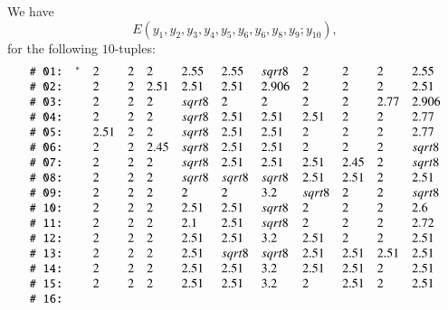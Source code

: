 \begin{tarskidata}
\begin{tarski}
\begin{lemma}
We have 
   $$
   E(y_1,y_2,y_3,y_4,y_5,y_6,y_6,y_8,y_9;y_{10}),
   $$
for the following $10$-tuples:
$$
\def\tuid#1{\relax} %
\def\rr#1{\text{\tt \# #1:}}
\begin{array}{llllllllllll}
%
 \rr{01}&\tuid{GVKETKP} \tlabel{tarski:2t0-doesnt-pass-through}\usage{DCG-[4.19]{ lemma:2t0-doesnt-pass-through}}
   &2 &2 &2 & 2.55&  2.55 & \sqrt{8}&  2 & 2 & 2 & 2.55\\
%
 \rr{02}&\tuid{SDUXZXL}\tlabel{tarski:E1453}
   &2 &2 &2.51 &2.51& 2.51 &2.906& 2 & 2 &2 & 2.51\\ 
%
 \rr{03}&\tuid{DIKGYMO}\tlabel{tarski:dcg-p89}
   &2 &2 &2 &\sqrt8& 2 &2& 2 & 2 & 2.77 &2.906\\
%
 \rr{04}&\tuid{HYEOHXS}\tlabel{tarski:enclosed-v}
   &2 &2 &2 &\sqrt{8}& 2.51 &2.51& 2.51 & 2 & 2 &  2.77\\
%
 \rr{05}&\tuid{MCWJKBZ}\tlabel{tarski:277}
   &2.51 &2 &2 &\sqrt{8}& 2.51 &2.51& 2 & 2 & 2 & 2.77\\
%
 \rr{06}&\tuid{TVORNRR}\tlabel{tarski:245}
   &2 &2 &2.45 &\sqrt{8}& 2.51 &2.51& 2 & 2 & 2 & \sqrt{8}\\
%
 \rr{07}&\tuid{AMVZLGB}\tlabel{tarski:245bis}
   &2 &2 &2 &\sqrt{8}& 2.51 &2.51& 2.51 & 2.45 & 2 & \sqrt{8}\\
%
 \rr{08}&\tuid{TVBTKEK}\tlabel{tarski:node}
   &2 &2 &2 &\sqrt8& \sqrt8 &\sqrt8& 2.51 & 2.51 & 2 & 2.51\\
%
 \rr{09}&\tuid{UREAOFU}\tlabel{tarski:E:part4:1}
   &2 &2 &2 &  2& 2 &3.2&   \sqrt{8} & 2 & 2 &  \sqrt{8}\\
%
 \rr{10}&\tuid{MYWEFEM}\tlabel{tarski:E:part4:2}
   &2 &2 &2 &2.51 & 2.51  &\sqrt{8}&   2 & 2 & 2 &  2.6\\
%
 \rr{11}&\tuid{EVWERXQ}\tlabel{tarski:E:part4:3}
   &2 &2 &2 &2.1& 2.51  &\sqrt{8}&   2 & 2 & 2 &  2.72\\
%
 \rr{12}&\tuid{EKTYKKO}\tlabel{tarski:E:part4:4}
   &    2 &2 &2 &  2.51& 2.51 &3.2&   2.51 & 2 & 2 & 2.51\\
%
 \rr{13}&\tuid{TZKIBQD}\tlabel{tarski:E:part4:5}
   &2 &2 &2 &2.51& \sqrt{8} &\sqrt{8}& 2.51 & 2.51 & 2.51 & 2.51\\
%
 \rr{14}&\tuid{NYHXWOU}\tlabel{tarski:E:part4:6}
   &2 &2 &2 &2.51& 2.51 &3.2& 2.51 & 2.51 & 2 & 2.51\\
%
 \rr{15}&\tuid{HCEDPSK}\tlabel{tarski:E:part4:7}
   &2 &2 &2 &2.51& 2.51 &3.2& 2 & 2.51 & 2 & 2.51\\
%
 \rr{16}&\tuid{ZDKFOUK}\tlabel{tarski:E:part4:8}

\end{array}$$
\end{lemma}
\end{tarski}
\end{tarskidata}
